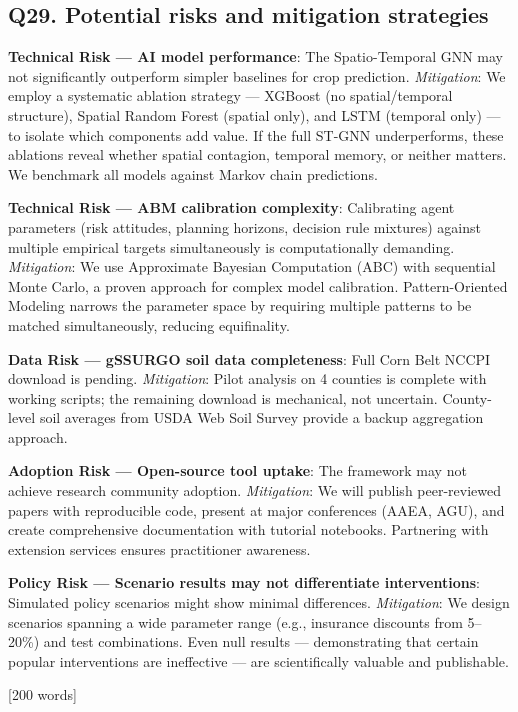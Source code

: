 \documentclass[11pt,letterpaper]{article}
\newcommand{\answer}[1]{%
    \vspace{0.2em}%
    \noindent\colorbox{answerbox}{\parbox{\dimexpr\textwidth-2\fboxsep}{%
        \vspace{0.4em}#1\vspace{0.4em}%
    }}%
    \vspace{0.5em}%
}
\newcommand{\wordcount}[1]{%
    \hfill{\scriptsize\textcolor{notegray}{[#1 words]}}%
}
\begin{document}
\subsection{Q29. Potential risks and mitigation strategies}
\answer{%
\textbf{Technical Risk --- AI model performance}: The Spatio-Temporal GNN may not significantly outperform simpler baselines for crop prediction. \textit{Mitigation}: We employ a systematic ablation strategy --- XGBoost (no spatial/temporal structure), Spatial Random Forest (spatial only), and LSTM (temporal only) --- to isolate which components add value. If the full ST-GNN underperforms, these ablations reveal whether spatial contagion, temporal memory, or neither matters. We benchmark all models against Markov chain predictions.

\textbf{Technical Risk --- ABM calibration complexity}: Calibrating agent parameters (risk attitudes, planning horizons, decision rule mixtures) against multiple empirical targets simultaneously is computationally demanding. \textit{Mitigation}: We use Approximate Bayesian Computation (ABC) with sequential Monte Carlo, a proven approach for complex model calibration. Pattern-Oriented Modeling narrows the parameter space by requiring multiple patterns to be matched simultaneously, reducing equifinality.

\textbf{Data Risk --- gSSURGO soil data completeness}: Full Corn Belt NCCPI download is pending. \textit{Mitigation}: Pilot analysis on 4 counties is complete with working scripts; the remaining download is mechanical, not uncertain. County-level soil averages from USDA Web Soil Survey provide a backup aggregation approach.

\textbf{Adoption Risk --- Open-source tool uptake}: The framework may not achieve research community adoption. \textit{Mitigation}: We will publish peer-reviewed papers with reproducible code, present at major conferences (AAEA, AGU), and create comprehensive documentation with tutorial notebooks. Partnering with extension services ensures practitioner awareness.

\textbf{Policy Risk --- Scenario results may not differentiate interventions}: Simulated policy scenarios might show minimal differences. \textit{Mitigation}: We design scenarios spanning a wide parameter range (e.g., insurance discounts from 5--20\%) and test combinations. Even null results --- demonstrating that certain popular interventions are ineffective --- are scientifically valuable and publishable.}
\wordcount{200}
\end{document}
